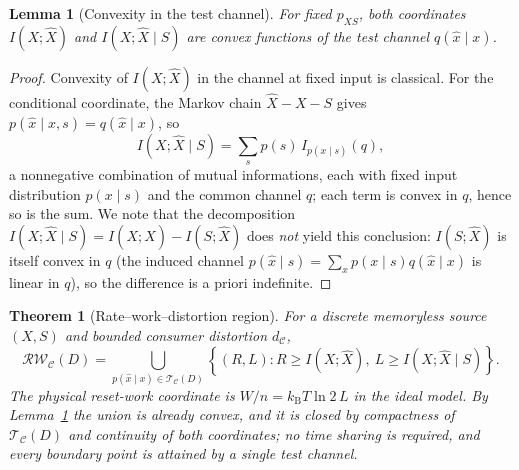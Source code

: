 \documentclass[letterpaper,onecolumn]{IEEEtran}
\newtheorem{theorem}{Theorem}
\newtheorem{lemma}{Lemma}
\theoremstyle{definition}
\theoremstyle{remark}
\newcommand{\cC}{\mathcal{C}}
\newcommand{\hX}{\widehat{X}}
\newcommand{\RW}{\mathcal{R}\!\mathcal{W}}
\newcommand{\1}{\mathbf{1}}
\newcommand{\kb}{k_{\mathrm B}}
\begin{document}
\begin{lemma}[Convexity in the test channel]\label{lem:convexity}
For fixed $p_{XS}$, both coordinates $I(X;\hX)$ and $I(X;\hX\mid S)$ are convex
functions of the test channel $q(\hat x\mid x)$.
\end{lemma}

\begin{proof}
Convexity of $I(X;\hX)$ in the channel at fixed input is classical. For the
conditional coordinate, the Markov chain $\hX-X-S$ gives
$p(\hat x\mid x,s)=q(\hat x\mid x)$, so
\begin{equation}
 I(X;\hX\mid S)=\sum_s p(s)\,I_{p(x\mid s)}(q),
 \label{eq:per-s-decomposition}
\end{equation}
a nonnegative combination of mutual informations, each with fixed input
distribution $p(x\mid s)$ and the common channel $q$; each term is convex in
$q$, hence so is the sum. We note that the decomposition
$I(X;\hX\mid S)=I(X;\hX)-I(S;\hX)$ does \emph{not} yield this conclusion:
$I(S;\hX)$ is itself convex in $q$ (the induced channel
$p(\hat x\mid s)=\sum_x p(x\mid s)q(\hat x\mid x)$ is linear in $q$), so the
difference is a priori indefinite.
\end{proof}

\begin{theorem}[Rate--work--distortion region]\label{thm:main-region}
For a discrete memoryless source $(X,S)$ and bounded consumer distortion
$d_{\cC}$,
\begin{equation}
\boxed{
 \RW_{\cC}(D)
 =\bigcup_{p(\hat x\mid x)\in\mathcal T_{\cC}(D)}
 \left\{(R,L):
 R\ge I(X;\hX),\
 L\ge I(X;\hX\mid S)
 \right\}.}
 \label{eq:main-region}
\end{equation}
The physical reset-work coordinate is $W/n=\kb T\ln2\,L$ in the ideal model.
By Lemma~\ref{lem:convexity} the union is already convex, and it is closed by
compactness of $\mathcal T_{\cC}(D)$ and continuity of both coordinates; no
time sharing is required, and every boundary point is attained by a single
test channel.
\end{theorem}
\end{document}
